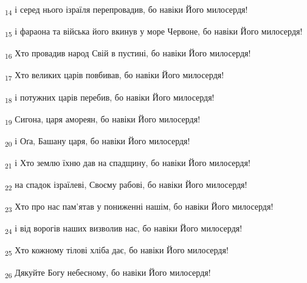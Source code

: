 \begin{tcolorbox}
\textsubscript{14} і серед нього ізраїля перепровадив, бо навіки Його милосердя!
\end{tcolorbox}
\begin{tcolorbox}
\textsubscript{15} і фараона та війська його вкинув у море Червоне, бо навіки Його милосердя!
\end{tcolorbox}
\begin{tcolorbox}
\textsubscript{16} Хто провадив народ Свій в пустині, бо навіки Його милосердя!
\end{tcolorbox}
\begin{tcolorbox}
\textsubscript{17} Хто великих царів повбивав, бо навіки Його милосердя!
\end{tcolorbox}
\begin{tcolorbox}
\textsubscript{18} і потужних царів перебив, бо навіки Його милосердя!
\end{tcolorbox}
\begin{tcolorbox}
\textsubscript{19} Сигона, царя амореян, бо навіки Його милосердя!
\end{tcolorbox}
\begin{tcolorbox}
\textsubscript{20} і Оґа, Башану царя, бо навіки Його милосердя!
\end{tcolorbox}
\begin{tcolorbox}
\textsubscript{21} і Хто землю їхню дав на спадщину, бо навіки Його милосердя!
\end{tcolorbox}
\begin{tcolorbox}
\textsubscript{22} на спадок ізраїлеві, Своєму рабові, бо навіки Його милосердя!
\end{tcolorbox}
\begin{tcolorbox}
\textsubscript{23} Хто про нас пам'ятав у пониженні нашім, бо навіки Його милосердя!
\end{tcolorbox}
\begin{tcolorbox}
\textsubscript{24} і від ворогів наших визволив нас, бо навіки Його милосердя!
\end{tcolorbox}
\begin{tcolorbox}
\textsubscript{25} Хто кожному тілові хліба дає, бо навіки Його милосердя!
\end{tcolorbox}
\begin{tcolorbox}
\textsubscript{26} Дякуйте Богу небесному, бо навіки Його милосердя!
\end{tcolorbox}

